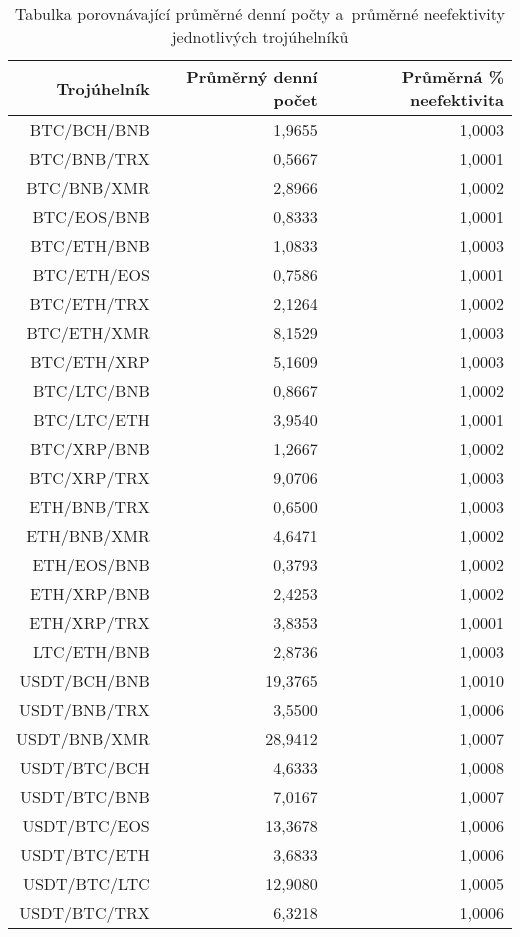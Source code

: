 \begin{table}\centering
\caption{Tabulka porovnávající průměrné denní počty a~průměrné neefektivity jednotlivých trojúhelníků}
\label{table_averages}
\begin{tabular}{|| r | r | r ||}\hline Trojúhelník & Průměrný denní počet & Průměrná \% neefektivita\\ [0.5ex]
 \hline\hline BTC/BCH/BNB & 1,9655 & 1,0003\\ 
 \hline BTC/BNB/TRX & 0,5667 & 1,0001\\ 
 \hline BTC/BNB/XMR & 2,8966 & 1,0002\\ 
 \hline BTC/EOS/BNB & 0,8333 & 1,0001\\ 
 \hline BTC/ETH/BNB & 1,0833 & 1,0003\\ 
 \hline BTC/ETH/EOS & 0,7586 & 1,0001\\ 
 \hline BTC/ETH/TRX & 2,1264 & 1,0002\\ 
 \hline BTC/ETH/XMR & 8,1529 & 1,0003\\ 
 \hline BTC/ETH/XRP & 5,1609 & 1,0003\\ 
 \hline BTC/LTC/BNB & 0,8667 & 1,0002\\ 
 \hline BTC/LTC/ETH & 3,9540 & 1,0001\\ 
 \hline BTC/XRP/BNB & 1,2667 & 1,0002\\ 
 \hline BTC/XRP/TRX & 9,0706 & 1,0003\\ 
 \hline ETH/BNB/TRX & 0,6500 & 1,0003\\ 
 \hline ETH/BNB/XMR & 4,6471 & 1,0002\\ 
 \hline ETH/EOS/BNB & 0,3793 & 1,0002\\ 
 \hline ETH/XRP/BNB & 2,4253 & 1,0002\\ 
 \hline ETH/XRP/TRX & 3,8353 & 1,0001\\ 
 \hline LTC/ETH/BNB & 2,8736 & 1,0003\\ 
 \hline USDT/BCH/BNB & 19,3765 & 1,0010\\ 
 \hline USDT/BNB/TRX & 3,5500 & 1,0006\\ 
 \hline USDT/BNB/XMR & 28,9412 & 1,0007\\ 
 \hline USDT/BTC/BCH & 4,6333 & 1,0008\\ 
 \hline USDT/BTC/BNB & 7,0167 & 1,0007\\ 
 \hline USDT/BTC/EOS & 13,3678 & 1,0006\\ 
 \hline USDT/BTC/ETH & 3,6833 & 1,0006\\ 
 \hline USDT/BTC/LTC & 12,9080 & 1,0005\\ 
 \hline USDT/BTC/TRX & 6,3218 & 1,0006\\ 

\end{tabular}
\end{table}
